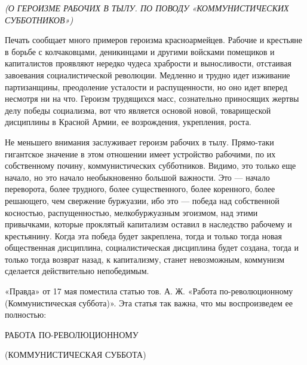 \documentclass[12pt]{article}
\newcommand{\parnum}{(\arabic{parcount})}
\newcounter{parcount}
\newenvironment{parnumbers}{%
  \par%
  \everypar{\noindent \stepcounter{parcount}\marginpar[]{\parnum}}%
}{}
\begin{document}
\textit{(О ГЕРОИЗМЕ РАБОЧИХ В ТЫЛУ. ПО ПОВОДУ «КОММУНИСТИЧЕСКИХ СУББОТНИКОВ»)}

\begin{parnumbers}
Печать сообщает много примеров героизма красноармейцев. Рабочие и крестьяне в борьбе с колчаковцами, деникинцами и другими войсками помещиков и капиталистов проявляют нередко чудеса храбрости и выносливости, отстаивая завоевания социалистической революции. Медленно и трудно идет изживание партизанщины, преодоление усталости и распущенности, но оно идет вперед несмотря ни на что. Героизм трудящихся масс, сознательно приносящих жертвы делу победы социализма, вот что является основой новой, товарищеской дисциплины в Красной Армии, ее возрождения, укрепления, роста.

Не меньшего внимания заслуживает героизм рабочих в тылу. Прямо-таки гигантское значение в этом отношении имеет устройство рабочими, по их собственному почину, коммунистических субботников. Видимо, это только еще начало, но это начало необыкновенно большой важности. Это — начало переворота, более трудного, более существенного, более коренного, более решающего, чем свержение буржуазии, ибо это — победа над собственной косностью, распущенностью, мелкобуржуазным эгоизмом, над этими привычками, которые проклятый капитализм оставил в наследство рабочему и крестьянину. Когда эта победа будет закреплена, тогда и только тогда новая общественная дисциплина, социалистическая дисциплина будет создана, тогда и только тогда возврат назад, к капитализму, станет невозможным, коммунизм сделается действительно непобедимым.

«Правда» от 17 мая поместила статью тов. А. Ж. «Работа по-революционному (Коммунистическая суббота)». Эта статья так важна, что мы воспроизведем ее полностью:
\end{parnumbers}

РАБОТА ПО-РЕВОЛЮЦИОННОМУ

(КОММУНИСТИЧЕСКАЯ СУББОТА)
\end{document}
